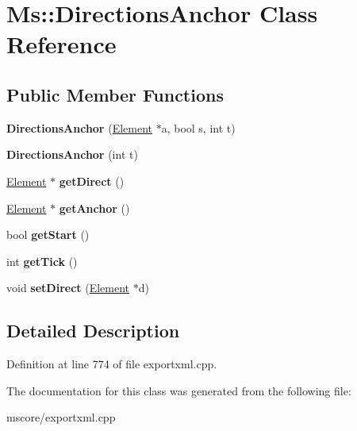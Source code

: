 \hypertarget{class_ms_1_1_directions_anchor}{}\section{Ms\+:\+:Directions\+Anchor Class Reference}
\label{class_ms_1_1_directions_anchor}
\subsection*{Public Member Functions}
\begin{DoxyCompactItemize}
\item 
\mbox{\label{class_ms_1_1_directions_anchor_aad99f856efe7d2c97740fac38fb58ddb}} 
{\bfseries Directions\+Anchor} (\hyperlink{class_ms_1_1_element}{Element} $\ast$a, bool s, int t)
\item 
\mbox{\label{class_ms_1_1_directions_anchor_a5fe55663eaeb542655456e49f53a93d7}} 
{\bfseries Directions\+Anchor} (int t)
\item 
\mbox{\label{class_ms_1_1_directions_anchor_ac71029e0d56c1c74671dd31d5fede8bf}} 
\hyperlink{class_ms_1_1_element}{Element} $\ast$ {\bfseries get\+Direct} ()
\item 
\mbox{\label{class_ms_1_1_directions_anchor_a99b15067d78a2193b1e027dc42a2a488}} 
\hyperlink{class_ms_1_1_element}{Element} $\ast$ {\bfseries get\+Anchor} ()
\item 
\mbox{\label{class_ms_1_1_directions_anchor_a11cb71e45f92466bf7e1c36be5051922}} 
bool {\bfseries get\+Start} ()
\item 
\mbox{\label{class_ms_1_1_directions_anchor_ab0636ccde5cc816f6b09b02c30fd965a}} 
int {\bfseries get\+Tick} ()
\item 
\mbox{\label{class_ms_1_1_directions_anchor_a1a08a3a629e1bae9a10319d804304336}} 
void {\bfseries set\+Direct} (\hyperlink{class_ms_1_1_element}{Element} $\ast$d)
\end{DoxyCompactItemize}


\subsection{Detailed Description}


Definition at line 774 of file exportxml.\+cpp.



The documentation for this class was generated from the following file\+:\begin{DoxyCompactItemize}
\item 
mscore/exportxml.\+cpp\end{DoxyCompactItemize}
